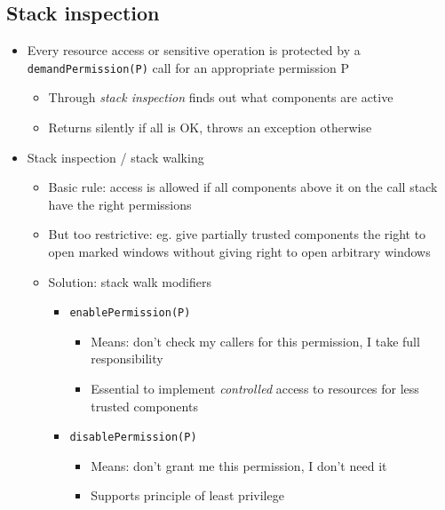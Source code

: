 \documentclass[12pt,titlepage,a4paper]{report}
\begin{document}
	\subsection{Stack inspection}
	\begin{itemize}
		\item Every resource access or sensitive operation is protected by a \texttt{demandPermission(P)} call for an appropriate permission P
		\begin{itemize}
			\item Through \textit{stack inspection} finds out what components are active
			\item Returns silently if all is OK, throws an exception otherwise
		\end{itemize}
		\item Stack inspection / stack walking
		\begin{itemize}
			\item Basic rule: access is allowed if all components above it on the call stack have the right permissions
			\item But too restrictive: eg. give partially trusted components the right to open marked windows without giving right to open arbitrary windows
			\item Solution: stack walk modifiers
			\begin{itemize}
				\item \texttt{enablePermission(P)}
				\begin{itemize}
					\item Means: don't check my callers for this permission, I take full responsibility
					\item Essential to implement \emph{controlled} access to resources for less trusted components
				\end{itemize}
				\item \texttt{disablePermission(P)}
				\begin{itemize}
					\item Means: don't grant me this permission, I don't need it
					\item Supports principle of least privilege
				\end{itemize}
			\end{itemize}
		\end{itemize}
	\end{itemize}
	
\end{document}
